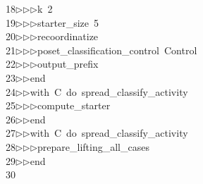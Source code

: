 \begin{tabbing}
18\>$\triangleright$\>$\triangleright$\>$\triangleright$\>k\ 2\ \\[0pt]
19\>$\triangleright$\>$\triangleright$\>$\triangleright$\>starter\_size\ 5\ \\[0pt]
20\>$\triangleright$\>$\triangleright$\>$\triangleright$\>recoordinatize\ \\[0pt]
21\>$\triangleright$\>$\triangleright$\>$\triangleright$\>poset\_classification\_control\ Control\ \\[0pt]
22\>$\triangleright$\>$\triangleright$\>$\triangleright$\>output\_prefix\ \ \\[0pt]
23\>$\triangleright$\>$\triangleright$\>end\ \\[0pt]
24\>$\triangleright$\>$\triangleright$\>with\ C\ do\ spread\_classify\_activity\ \\[0pt]
25\>$\triangleright$\>$\triangleright$\>$\triangleright$\>compute\_starter\ \\[0pt]
26\>$\triangleright$\>$\triangleright$\>end\ \\[0pt]
27\>$\triangleright$\>$\triangleright$\>with\ C\ do\ spread\_classify\_activity\ \\[0pt]
28\>$\triangleright$\>$\triangleright$\>$\triangleright$\>prepare\_lifting\_all\_cases\ \\[0pt]
29\>$\triangleright$\>$\triangleright$\>end\\[0pt]
30\>\end{tabbing}
